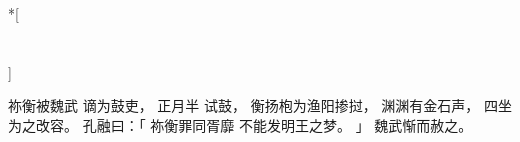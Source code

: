 
\switchcolumn[0]*[\section{}]

祢衡被魏武
谪为鼓吏，
正月半
试鼓，
衡扬枹为渔阳掺挝，
渊渊有金石声，
四坐为之改容。
孔融曰：「
    祢衡罪同胥靡
    不能发明王之梦。
」
魏武惭而赦之。

\switchcolumn



